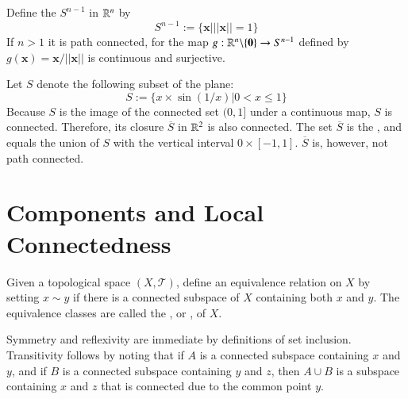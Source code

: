 \documentclass[12pt, a4paper, oneside, openright, titlepage]{book}
\begin{document}
\begin{eg}
    Define the  $S^{n-1}$ in $\mathbb R^n$ by \begin{equation*}
        S^{n-1} := \{\mathbf{x}\vert||\mathbf{x}|| = 1\}
    \end{equation*}
    If $n >1$ it is path connected, for the map $g:\mathbb R^n\backslash\{\mathbf{0}\}\rightarrow S^{n-1}$ defined by $g(\mathbf{x}) = \mathbf{x}/||\mathbf{x}||$ is continuous and surjective.
\end{eg}

\begin{eg}
    Let $S$ denote the following subset of the plane: \begin{equation*}
        S := \{x\times \sin(1/x) \vert 0 < x \leq 1\}
    \end{equation*}
    Because $S$ is the image of the connected set $(0,1]$ under a continuous map, $S$ is connected. Therefore, its closure $\overline{S}$ in $\mathbb R^2$ is also connected. The set $\overline{S}$ is the , and equals the union of $S$ with the vertical interval $0\times [-1,1]$. $\overline{S}$ is, however, not path connected.
\end{eg}




\section{Components and Local Connectedness}

\begin{defn}
    Given a topological space $(X,\mathcal{T})$, define an equivalence relation on $X$ by setting $x \sim y$ if there is a connected subspace of $X$ containing both $x$ and $y$. The equivalence classes are called the , or , of $X$.
\end{defn}

Symmetry and reflexivity are immediate by definitions of set inclusion. Transitivity follows by noting that if $A$ is a connected subspace containing $x$ and $y$, and if $B$ is a connected subspace containing $y$ and $z$, then $A\cup B$ is a subspace containing $x$ and $z$ that is connected due to the common point $y$.
\end{document}
